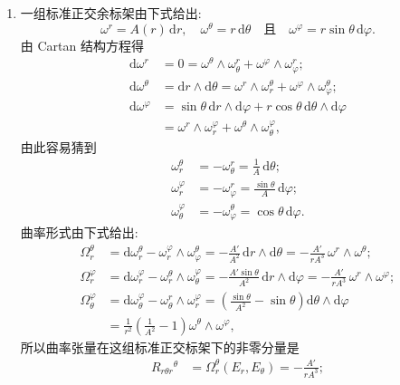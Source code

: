 \begin{description}[font=\normalfont,leftmargin=2em,labelwidth=1.5em]
\begin{enumerate}[label=(\alph*),ref=\alph*,leftmargin=*]
\item 一组标准正交余标架由下式给出:
\[
  \omega^r=A(r)\,\mathrm{d}r,\quad\omega^\theta=r\,\mathrm{d}\theta
  \quad\text{且}\quad \omega^\varphi=r\sin\theta\,\mathrm{d}\varphi.
\]
由 Cartan 结构方程得
\begin{align*}
  \mathrm{d}\omega^r&=0=\omega^\theta\wedge\omega_\theta^r+\omega^\varphi\wedge\omega_\varphi^r;\\
  \mathrm{d}\omega^\theta&=\mathrm{d}r\wedge\mathrm{d}\theta
   =\omega^r\wedge\omega_r^\theta+\omega^\varphi\wedge\omega_\varphi^\theta;\\
  \mathrm{d}\omega^\varphi&=\sin\theta\,\mathrm{d}r\wedge\mathrm{d}\varphi+
        r\cos\theta\,\mathrm{d}\theta\wedge\mathrm{d}\varphi\\
   &=\omega^r\wedge\omega_r^\varphi+\omega^\theta\wedge\omega_\theta^\varphi,
\end{align*}
由此容易猜到
\begin{align*}
  \omega_r^\theta&=-\omega_\theta^r=\frac1A\,\mathrm{d}\theta;\\
  \omega_r^\varphi&=-\omega_\varphi^r=\frac{\sin\theta}{A}\,\mathrm{d}\varphi;\\
  \omega_\theta^\varphi&=-\omega_\varphi^\theta=\cos\theta\,\mathrm{d}\varphi.
\end{align*}
曲率形式由下式给出:
\begin{align*}
  \Omega_r^\theta
  &=\mathrm{d}\omega_r^\theta-\omega_r^\varphi\wedge\omega_\varphi^\theta
    =-\frac{A'}{A^2}\,\mathrm{d}r\wedge\mathrm{d}\theta=-\frac{A'}{rA^3}\,\omega^r\wedge\omega^\theta;\\
  \Omega_r^\varphi
  &=\mathrm{d}\omega_r^\varphi-\omega_r^\theta\wedge\omega_\theta^\varphi
    =-\frac{A'\sin\theta}{A^2}\,\mathrm{d}r\wedge\mathrm{d}\varphi=-\frac{A'}{rA^3}\,\omega^r\wedge\omega^\varphi;\\
  \Omega_\theta^\varphi
  &=\mathrm{d}\omega_\theta^\varphi-\omega_\theta^r\wedge\omega_r^\varphi
    =\left(\frac{\sin\theta}{A^2}-\sin\theta\right)\mathrm{d}\theta\wedge\mathrm{d}\varphi\\
  &=\frac1{r^2}\left(\frac1{A^2}-1\right)\omega^\theta\wedge\omega^\varphi,
\end{align*}
所以曲率张量在这组标准正交标架下的非零分量是
\begin{align*}
  R_{r\theta r}{}^\theta&=\Omega_r^\theta(E_r,E_\theta)=-\frac{A'}{rA^3};\\

\end{align*}
\end{enumerate}
\end{description}
